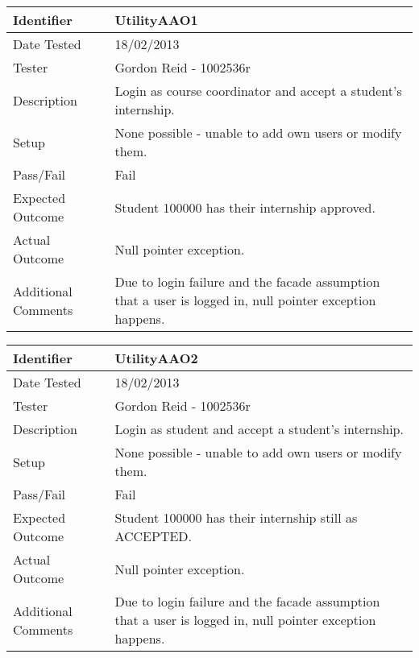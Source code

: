 \documentclass[11pt]{l3deliverable}
\begin{document}
\begin{tabularx}{\textwidth}{|T|L|}
\hline
Identifier & UtilityAAO1\\
\hline
Date Tested & 18/02/2013\\
\hline
Tester & Gordon Reid - 1002536r\\
\hline
Description & Login as course coordinator and accept a student's internship.\\
\hline
Setup & None possible - unable to add own users or modify them.\\
\hline
Pass/Fail & Fail\\
\hline
Expected Outcome & Student 100000 has their internship approved.\\
\hline
Actual Outcome & Null pointer exception.\\
\hline
Additional Comments & Due to login failure and the facade assumption that a
user is logged in, null pointer exception happens.\\
\hline
\end{tabularx}

\vspace{2em}

\begin{tabularx}{\textwidth}{|T|L|}
\hline
Identifier & UtilityAAO2\\
\hline
Date Tested & 18/02/2013\\
\hline
Tester & Gordon Reid - 1002536r\\
\hline
Description & Login as student and accept a student's internship.\\
\hline
Setup & None possible - unable to add own users or modify them.\\
\hline
Pass/Fail & Fail\\
\hline
Expected Outcome & Student 100000 has their internship still as ACCEPTED.\\
\hline
Actual Outcome & Null pointer exception.\\
\hline
Additional Comments & Due to login failure and the facade assumption that a
user is logged in, null pointer exception happens.\\
\hline
\end{tabularx}

\vspace{2em}
\end{document}
